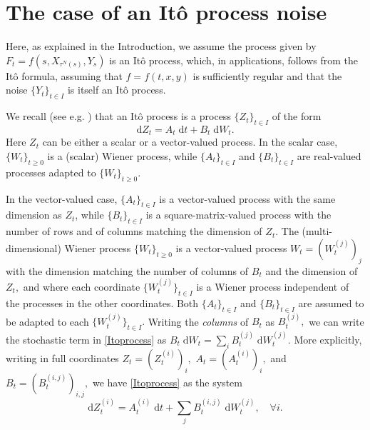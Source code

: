 \documentclass[reqno,12pt]{amsart}
\theoremstyle{plain} %
\theoremstyle{definition} %
\begin{document}
\section{The case of an It\^o process noise}
\label{secItonoise}

Here, as explained in the Introduction, we assume the process given by $F_t = f(s, X_{\tau^N(s)}, Y_s)$ is an It\^o process, which, in applications, follows from the It\^o formula, assuming that $f=f(t, x, y)$ is sufficiently regular and that the noise $\{Y_t\}_{t\in I}$ is itself an It\^o process.

We recall (see e.g. \cite[Chapter 4]{Oksendal2003}) that an It\^o process is a process $\{Z_t\}_{t\in I}$ of the form
\begin{equation}
    \label{Itoprocess}
    \mathrm{d}Z_t = A_t\;\mathrm{d}t + B_t\;\mathrm{d}W_t.
\end{equation}
Here $Z_t$ can be either a scalar or a vector-valued process. In the scalar case, $\{W_t\}_{t\geq 0}$ is a (scalar) Wiener process, while $\{A_t\}_{t\in I}$ and $\{B_t\}_{t\in I}$ are real-valued processes adapted to $\{W_t\}_{t\geq 0}$.

In the vector-valued case, $\{A_t\}_{t\in I}$ is a vector-valued process with the same dimension as $Z_t$, while $\{B_t\}_{t\in I}$ is a square-matrix-valued process with the number of rows and of columns matching the dimension of $Z_t.$ The (multi-dimensional) Wiener process $\{W_t\}_{t\geq 0}$ is a vector-valued process $W_t = (W_t^{(j)})_j$ with the dimension matching the number of columns of $B_t$ and the dimension of $Z_t,$ and where each coordinate $\{W_t^{(j)}\}_{t\in I}$ is a Wiener process independent of the processes in the other coordinates. Both $\{A_t\}_{t\in I}$ and $\{B_t\}_{t\in I}$ are assumed to be adapted to each $\{W_t^{(j)}\}_{t\in I}.$ Writing the \emph{columns} of $B_t$ as $B_t^{(j)},$ we can write the stochastic term in \eqref{Itoprocess} as $B_t\;\mathrm{d}W_t = \sum_i B_t^{(j)}\;\mathrm{d}W_t^{(j)}.$ More explicitly, writing in full coordinates $Z_t = (Z_t^{(i)})_i,$ $A_t = (A_t^{(i)})_i,$ and $B_t = (B_t^{(i, j)})_{i, j},$ we have \eqref{Itoprocess} as the system
\begin{equation}
    \label{Itoprocesssystem}
    \mathrm{d}Z_t^{(i)} = A_t^{(i)}\;\mathrm{d}t + \sum_j B_t^{(i, j)}\;\mathrm{d}W_t^{(j)}, \quad \forall i.
\end{equation}
\end{document}
